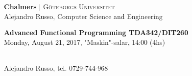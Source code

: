 \documentclass[a4,11pt]{article}
\newif\ifsol
\newif\iffrontpage
\begin{document}
\noindent
\textsf{\bfseries Chalmers} $\vert$ \textsc{G\"oteborgs Universitet}
\hfill ~\\
Alejandro Russo, Computer Science and Engineering \hfill ~\\

\vspace{2 em}
\begin{center}
{\Large {\bf Advanced Functional Programming TDA342/DIT260}}
\\[2ex]
Monday, August 21, 2017, "Maskin"-salar, 14:00 (4hs)
\ifsol
\\[2ex]
(including example solutions to programming problems)
\fi
\\[2ex]
Alejandro Russo, tel. 0729-744-968
\end{center}
\vspace{1 em}

\iffrontpage
\end{document}
